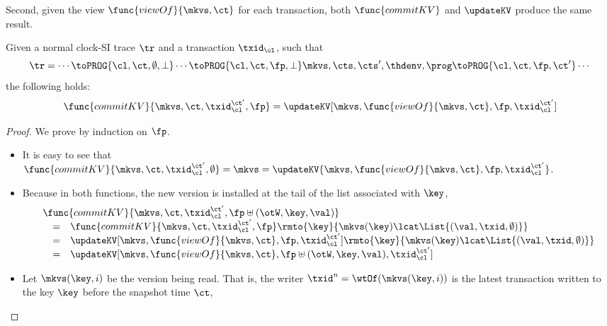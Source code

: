 Second, given the view \( \func{viewOf}{\mkvs,\ct} \) for each transaction, 
both \( \func{commitKV} \) and \( \updateKV \) produce the same result.
\begin{lemma}
    Given a normal clock-SI trace \( \tr \) and a transaction \( \txid_\cl \), such that
    \[
        \tr = \cdots \toPROG{\cl, \ct, \emptyset, \perp} \cdots \toPROG{\cl, \ct, \fp, \perp} \mkvs, \cts, \cts', \thdenv, \prog  \toPROG{\cl, \ct, \fp, \ct'} \cdots
    \] 
    the following holds:
    \[
        \func{commitKV}{\mkvs,\ct,\txid_\cl^{\ct'},\fp} = \updateKV[\mkvs, \func{viewOf}{\mkvs, \ct},\fp, \txid_\cl^{\ct'}] 
    \]
\end{lemma}
\begin{proof}
    We prove by induction on \( \fp \).
    \begin{itemize}
        \item \caseB{\( \fp = \emptyset \)}
            It is easy to see that \( \func{commitKV}{\mkvs,\ct,\txid_\cl^{\ct'},\emptyset} = \mkvs =  \updateKV{\mkvs, \func{viewOf}{\mkvs, \ct},\fp, \txid_\cl^{\ct'}} \).
        \item \caseI{\( \fp \uplus (\otW, \key, \val) \)}
            Because in both functions, the new version is installed at the tail of the list associated with \( \key \),
            \[
                \begin{array}{@{}l@{}}
                \func{commitKV}{\mkvs,\ct,\txid_\cl^{\ct'},\fp \uplus (\otW, \key, \val)}  \\
                \quad \begin{array}[t]{@{}c l@{}}
                = &
                \func{commitKV}{\mkvs,\ct,\txid_\cl^{\ct'},\fp}\rmto{\key}{\mkvs(\key) \lcat \List{(\val, \txid, \emptyset)}} \\
                = & 
                \updateKV[\mkvs,\func{viewOf}{\mkvs,\ct},\fp,\txid_\cl^{\ct'}]\rmto{\key}{\mkvs(\key) \lcat \List{(\val, \txid, \emptyset)}} \\
                = & 
                \updateKV[\mkvs,\func{viewOf}{\mkvs,\ct},\fp \uplus (\otW, \key, \val),\txid_\cl^{\ct'}]
                \end{array}
                \end{array}
            \]
        \item \caseI{\( \fp \uplus (\otR, \key, \val) \)}
            Let \( \mkvs(\key,i) \) be the version being read.
            That is, the writer \( \txid^n = \wtOf(\mkvs(\key,i)) \)
            is the latest transaction written to the key \( \key \) before the snapshot time \( \ct \),

\end{itemize}
\end{proof}
